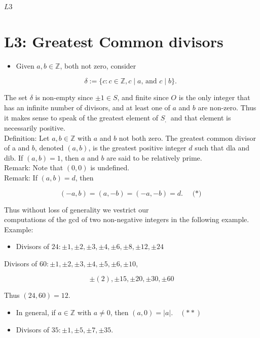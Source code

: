 \documentclass[10pt]{article}
\begin{document}
$L 3$

\section*{L3: Greatest Common divisors}
\begin{itemize}
  \item Given $a, b \in \mathbb{Z}$, both not zero, consider
\end{itemize}

$$
\delta:=\{c: c \in \mathbb{Z}, c \mid a \text {, and } c \mid b\} \text {. }
$$

The set $\delta$ is non-empty since $\pm 1 \in S$, and finite since $O$ is the only integer that has an infinite number of divisors, and at least one of $a$ and $b$ are non-zero. Thus it makes sense to speak of the greatest element of $S_{\text {, }}$ and that element is necessarily positive.\\
Definition: Let $a, b \in \mathbb{Z}$ with $a$ and $b$ not both zero. The greatest common divisor of a and $b$, denoted $(a, b)$, is the greatest positive integer $d$ such that dla and dib. If $(a, b)=1$, then $a$ and $b$ are said to be relatively prime.\\
Remark: Note that $(0,0)$ is undefined.\\
Remark: If $(a, b)=d$, then

$$
(-a, b)=(a,-b)=(-a,-b)=d . \quad \text { (*) }
$$

Thus without loss of generality we vestrict our\\
computations of the gcd of two non-negative integers in the following example.\\
Example:

\begin{itemize}
  \item Divisors of $24: \pm 1, \pm 2, \pm 3, \pm 4, \pm 6, \pm 8, \pm 12, \pm 24$
\end{itemize}

Divisors of $60: \pm 1, \pm 2, \pm 3, \pm 4, \pm 5, \pm 6, \pm 10$,

$$
\pm(2), \pm 15, \pm 20, \pm 30, \pm 60
$$

Thus $(24,60)=12$.

\begin{itemize}
  \item In general, if $a \in \mathbb{Z}$ with $a \neq 0$, then $(a, 0)=|a| . \quad(* *)$
  \item Divisors of $35: \pm 1, \pm 5, \pm 7, \pm 35$.
\end{itemize}
\end{document}
